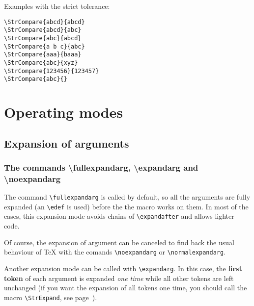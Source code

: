 \documentclass[a4paper,10pt]{article}
\newcommand\styleexemple{\small\vskip4pt}
\newcommand\verbinline{\lstinline[basicstyle=\normalsize\ttfamily]}
\begin{document}
Examples with the strict tolerance:\par\nobreak
\begin{minipage}[t]{0.65\linewidth}
\comparestrict
\begin{lstlisting}
\StrCompare{abcd}{abcd}
\StrCompare{abcd}{abc}
\StrCompare{abc}{abcd}
\StrCompare{a b c}{abc}
\StrCompare{aaa}{baaa}
\StrCompare{abc}{xyz}
\StrCompare{123456}{123457}
\StrCompare{abc}{}
\end{lstlisting}%
\end{minipage}\hfill
\begin{minipage}[t]{0.35\linewidth}
	\styleexemple
	\comparestrict
	\par
	\par
	\par
	\par
	\par
	\par
	\par
\end{minipage}%

\section{Operating modes}
\subsection{Expansion of arguments}
\label{devarg}
\subsubsection{The commands {\ttfamily \textbackslash fullexpandarg}, {\ttfamily \textbackslash expandarg} and {\ttfamily \textbackslash noexpandarg}}
The command \verbinline|\fullexpandarg| is called by default, so all the arguments are fully expanded (an \verbinline|\edef| is used) before the the macro works on them. In most of the cases, this expansion mode avoids chains of \verbinline|\expandafter| and allows lighter code.

Of course, the expansion of argument can be canceled to find back the usual behaviour of \TeX{} with the comands \verbinline|\noexpandarg| or \verbinline|\normalexpandarg|.\medskip

Another expansion mode can be called with \verbinline|\expandarg|. In this case, the \textbf{first token} of each argument is expanded \emph{one time} while all other tokens are left unchanged (if you want the expansion of all tokens one time, you should call the macro \verbinline|\StrExpand|, see page~\pageref{scancs}).\medskip
\end{document}

